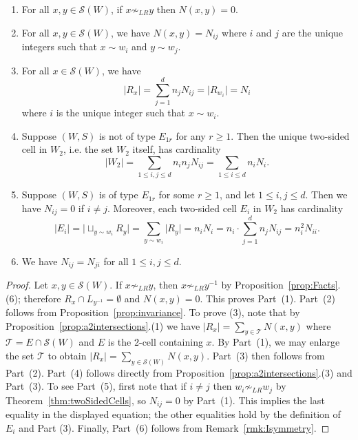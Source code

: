 \documentclass[ALCO,Unicode,published]{cedram}
\newcommand{\sw}{\mathcal{S}(W)}
\newcommand{\inverse}{^{-1}}
\newcommand{\abs}[1]{\lvert #1 \rvert}
\begin{document}
\begin{prop}
    \label{prop:Nij}
    \begin{enumerate} Maintain the notation of Theorem~\ref{thm:twoSidedCells}.
           \item For all $x,y\in \sw$, if $x\not\sim_{LR}y$ then $N(x,y)=0$. 
           \item For all $x,y\in\sw$, we have $N(x,y)=N_{ij}$ where $i$ and $j$ are the unique integers such that
            $x\sim w_i$ and $y\sim w_j$.
        \item For all $x\in \sw$, we have 
            \[
                \abs{R_x}=\sum_{j=1}^d n_j N_{ij} =\abs{
                R_{w_i}}=N_i
            \]
            where $i$ is the unique integer such that $x\sim w_i$.
        \item Suppose $(W,S)$ is not of type $E_{1r}$ for any $r\ge 1$. Then the unique two-sided cell
            in $W_2$, i.e. the set $W_2$ itself, has cardinality
            \[
                \abs{W_2}=\sum_{1\le i,j\le d} n_in_jN_{ij}= \sum_{1\le i\le d} n_i N_{i}. 
            \] 
        \item Suppose $(W,S)$ is of type $E_{1r}$ for some $r\ge 1$, and let
          $1\le i,j\le d$. Then we have $N_{ij}=0$
                if $i\neq j$. Moreover, each two-sided cell $E_i$ in $W_2$ has cardinality
            \[
                \abs{E_i}=\abs{\sqcup_{y\sim w_i}R_y}=\sum_{y\sim w_i}\abs{R_y}=n_i N_i=n_i\cdot \sum_{j=1}^d
                n_jN_{ij}= n_i^2N_{ii}.
            \]
        \item We have $N_{ij}=N_{ji}$ for all $1\le i,j\le d$. 
    \end{enumerate} 
\end{prop}
\begin{proof}
Let $x,y\in \sw$. If $x\not\sim_{LR} y$, then $x\not\sim_{LR} y\inverse$ by Proposition~\ref{prop:Facts}.(6);
therefore $R_x\cap L_{y\inverse}=\emptyset$ and $N(x,y)=0$. This proves Part~(1).  Part~(2) follows
from Proposition~\ref{prop:invariance}.  To prove (3), note that by Proposition~\ref{prop:a2intersections}.(1) we have
$\abs{R_x}=\sum_{y\in \mathcal {T}}N(x,y)$ where $\mathcal{T}=E\cap \sw$ and $E$ is the 2-cell
containing $x$. By Part~(1), we may enlarge the set $\mathcal{T}$ to obtain $\abs{R_x}=\sum_{y\in
\sw}N(x,y)$.  Part~(3) then follows from Part~(2).  Part~(4) follows directly from
Proposition~\ref{prop:a2intersections}.(3) and Part~(3). To see Part~(5), first note that if $i\neq j$ then
$w_i\not\sim_{LR} w_j$ by Theorem~\ref{thm:twoSidedCells}, so $N_{ij}=0$ by Part~(1). This implies the last
equality in the displayed equation; the other equalities hold by the definition of $E_i$ and Part
(3).  Finally, Part~(6) follows from Remark~\ref{rmk:Isymmetry}.
\end{proof} 
\end{document}
